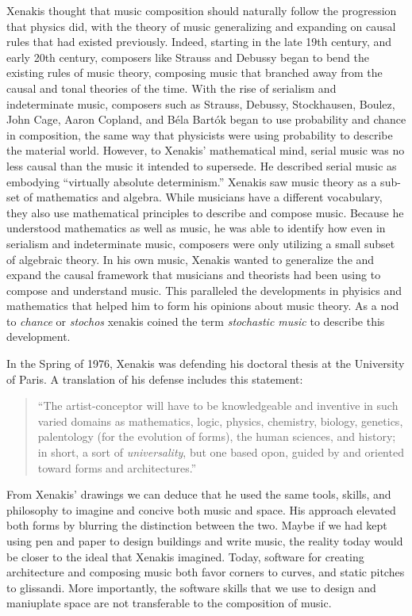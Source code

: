 \documentclass{tufte-book}
\newcommand{\TODO}[1]{\textcolor{red}{\bf TODO:#1}\xspace}
\begin{document}
Xenakis thought that music composition should naturally follow the
progression that physics did, with the theory of music generalizing
and expanding on causal rules that had existed previously. Indeed,
starting in the late 19th century, and early 20th century, composers
like Strauss and Debussy began to bend the existing rules of music
theory, composing music that branched away from the causal and tonal
theories of the time. With the rise of serialism\sidenote{\TODO{Brief
    Serialism Explianation}} and indeterminate
music\sidenote{\TODO{Brief Indeterminate Music explaination}},
composers such as Strauss, Debussy, Stockhausen, Boulez, John Cage,
Aaron Copland, and B\'{e}la Bart\'{o}k began to use probability and
chance in composition, the same way that physicists were using
probability to describe the material world. However, to Xenakis'
mathematical mind, serial music was no less causal than the music it
intended to supersede. He described serial music as embodying
``virtually absolute determinism.''\cite{xenakis1992formalized}
Xenakis saw music theory as a sub-set of mathematics and
algebra. While musicians have a different vocabulary, they also use
mathematical principles to describe and compose music. Because he
understood mathematics as well as music, he was able to identify how
even in serialism and indeterminate music, composers were only utilizing a
small subset of algebraic theory. In his own music, Xenakis wanted to
generalize the and expand the causal framework that musicians and
theorists had been using to compose and understand music. This
paralleled the developments in phyisics and mathematics that helped
him to form his opinions about music theory.  As a nod to
\emph{chance} or \emph{stochos} xenakis coined the term
\emph{stochastic music} to describe this development.

In the Spring of 1976, Xenakis was defending his doctoral thesis at
the University of Paris. A translation of his defense includes this
statement:
\begin{quotation}
  ``The artist-conceptor will have to be knowledgeable and inventive
  in such varied domains as mathematics, logic, physics, chemistry,
  biology, genetics, palentology (for the evolution of forms), the
  human sciences, and history; in short, a sort of
  \emph{universality}, but one based opon, guided by and oriented
  toward forms and architectures.'' \cite{russolo1986art}
\end{quotation}

From Xenakis' drawings we can deduce that he used the same tools,
skills, and philosophy to imagine and concive both music and
space. His approach elevated both forms by blurring the distinction
between the two. Maybe if we had kept using pen and paper to design
buildings and write music, the reality today would be closer to the
ideal that Xenakis imagined. Today, software for creating architecture
and composing music both favor corners to curves, and static pitches
to glissandi. More importantly, the software skills that we use to
design and maniuplate space are not transferable to the composition of
music.
\end{document}
